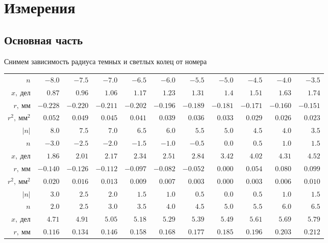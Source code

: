 \documentclass[10pt,a4paper]{article}
\begin{document}
\section*{Измерения}
\subsection*{Основная часть}
Снимем зависимость радиуса темных и светлых колец от номера
\begin{table}[h]
\centering
\begin{tabular}{r|rrrrrrrrrr}\\
$n$ & $-8.0$  & $-7.5$  & $-7.0$  & $-6.5$  & $-6.0$  & $-5.5$  & $-5.0$  & $-4.5$  & $-4.0$  & $-3.5$\\
$x,\ \text{дел}$ & $0.87$  & $0.96$  & $1.06$  & $1.17$  & $1.23$  & $1.31$  & $1.4$  & $1.51$  & $1.63$  & $1.74$\\
$r,\ \text{мм}$ & $-0.228$  & $-0.220$  & $-0.211$  & $-0.202$  & $-0.196$  & $-0.189$  & $-0.181$  & $-0.171$  & $-0.160$  & $-0.151$\\
$r^2,\ \text{мм}^2$ & $0.052$  & $0.049$  & $0.045$  & $0.041$  & $0.039$  & $0.036$  & $0.033$  & $0.029$  & $0.026$  & $0.023$\\
$|n|$ & $8.0$  & $7.5$  & $7.0$  & $6.5$  & $6.0$  & $5.5$  & $5.0$  & $4.5$  & $4.0$  & $3.5$\\
\hline
$n$ & $-3.0$  & $-2.5$  & $-2.0$  & $-1.5$  & $-1.0$  & $-0.5$  & $0.0$  & $0.5$  & $1.0$  & $1.5$\\
$x,\ \text{дел}$ & $1.86$  & $2.01$  & $2.17$  & $2.34$  & $2.51$  & $2.84$  & $3.42$  & $4.02$  & $4.31$  & $4.52$\\
$r,\ \text{мм}$ & $-0.140$  & $-0.126$  & $-0.112$  & $-0.097$  & $-0.082$  & $-0.052$  & $0.000$  & $0.054$  & $0.080$  & $0.099$\\
$r^2,\ \text{мм}^2$ & $0.020$  & $0.016$  & $0.013$  & $0.009$  & $0.007$  & $0.003$  & $0.000$  & $0.003$  & $0.006$  & $0.010$\\
$|n|$ & $3.0$  & $2.5$  & $2.0$  & $1.5$  & $1.0$  & $0.5$  & $0.0$  & $0.5$  & $1.0$  & $1.5$\\
\hline
$n$ & $2.0$  & $2.5$  & $3.0$  & $3.5$  & $4.0$  & $4.5$  & $5.0$  & $5.5$  & $6.0$  & $6.5$\\
$x,\ \text{дел}$ & $4.71$  & $4.91$  & $5.05$  & $5.18$  & $5.29$  & $5.39$  & $5.49$  & $5.61$  & $5.69$  & $5.79$\\
$r,\ \text{мм}$ & $0.116$  & $0.134$  & $0.146$  & $0.158$  & $0.168$  & $0.177$  & $0.185$  & $0.196$  & $0.203$  & $0.212$\\

\end{tabular}
\end{table}
\end{document}
